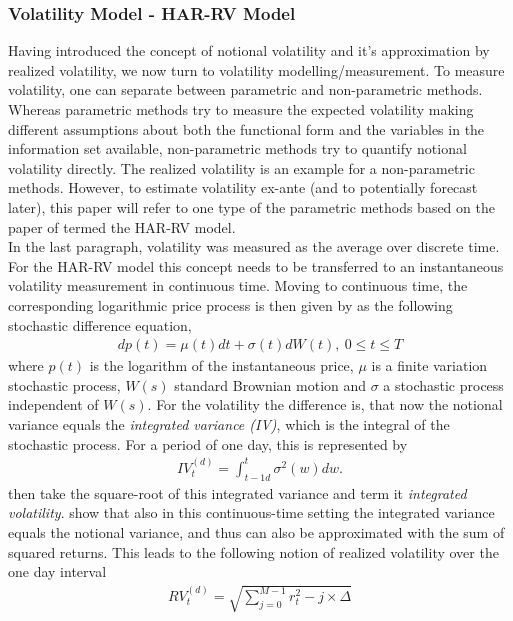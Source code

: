 \subsubsection{Volatility Model - HAR-RV Model}\label{sec:222HAR-RV}
Having introduced the concept of notional volatility and it's approximation by realized volatility, we now turn to volatility modelling/measurement. To measure volatility, one can separate between parametric and non-parametric methods. Whereas parametric methods try to measure the expected volatility making different assumptions about both the functional form and the variables in the information set available, non-parametric methods try to quantify notional volatility directly. The realized volatility is an example for a non-parametric methods. However, to estimate volatility ex-ante (and to potentially forecast later), this paper will refer to one type of the parametric methods based on the paper of \textcite{corsi2009} termed the HAR-RV model.\\
In the last paragraph, volatility was measured as the average over discrete time. For the HAR-RV model this concept needs to be transferred to an instantaneous volatility measurement in continuous time. Moving to continuous time, the corresponding logarithmic price process is then given by \textcite{corsi2009} as the following stochastic difference equation,
\begin{align}\label{eq:return-process-corsi}
dp(t) = \mu(t)dt + \sigma(t)dW(t), \ 0 \leq t \leq T
\end{align}
where $p(t)$ is the logarithm of the instantaneous price, $\mu$ is a finite variation stochastic process, $W(s)$ standard Brownian motion and $\sigma$ a stochastic process independent of $W(s)$. For the volatility the difference is, that now the notional variance equals the \emph{integrated variance (IV)}, which is the integral of the stochastic process. For a period of one day, this is represented by
\begin{align}
IV_{t}^{(d)} =  \int_{t-1d}^{t} \sigma^{2}(w)dw.
\end{align}
\textcite{corsi2009} then take the square-root of this integrated variance and term it \emph{integrated volatility}. \textcite{andersen2001} show that also in this continuous-time setting the integrated variance equals the notional variance, and thus can also be approximated with the sum of squared returns. This leads to the following notion of realized volatility over the one day interval
\begin{align}
RV_{t}^{(d)} = \sqrt{\sum_{j=0}^{M-1} r^{2}_t-j \times \Delta}
\end{align}
